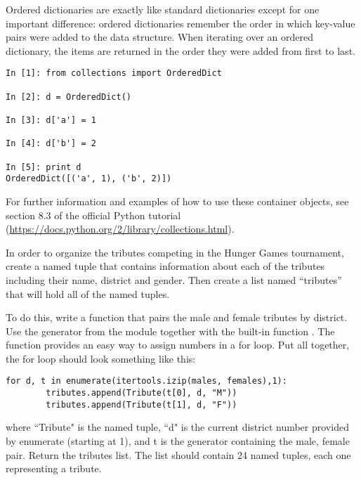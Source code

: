 Ordered dictionaries are exactly like standard dictionaries except for one important difference:
ordered dictionaries remember the order in which key-value pairs were added to the data structure.
When iterating over an ordered dictionary, the items are returned in the order they were added from first to last.

\begin{lstlisting}
In [1]: from collections import OrderedDict

In [2]: d = OrderedDict()

In [3]: d['a'] = 1

In [4]: d['b'] = 2

In [5]: print d
OrderedDict([('a', 1), ('b', 2)])

\end{lstlisting}

For further information and examples of how to use these container objects, see section 8.3 of the official Python tutorial (\url{https://docs.python.org/2/library/collections.html}).

\begin{problem}
In order to organize the tributes competing in the Hunger Games tournament, create a named tuple that contains information about each of the tributes including their name, district and gender. Then create a list named ``tributes'' that will hold all of the named tuples.

To do this, write a function that pairs the male and female tributes by district. Use the  generator from the  module together with the built-in function . The  function provides an easy way to assign numbers in a for loop.
Put all together, the for loop should look something like this:

\begin{lstlisting}
for d, t in enumerate(itertools.izip(males, females),1):
        tributes.append(Tribute(t[0], d, "M"))
        tributes.append(Tribute(t[1], d, "F"))
\end{lstlisting}

where ``Tribute" is the named tuple, ``d" is the current district number provided by enumerate (starting at 1), and t is the  generator containing the male, female pair. Return the tributes list. The list should contain 24 named tuples, each one representing a tribute.
\end{problem}


